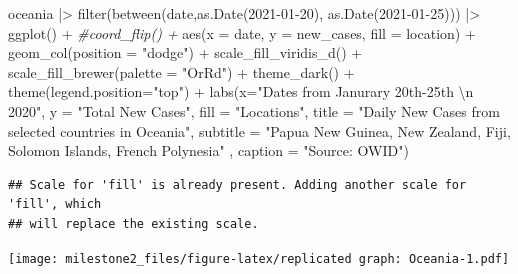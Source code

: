 \documentclass[
]{article}
\newenvironment{Shaded}{\begin{snugshade}}{\end{snugshade}}
\newcommand{\AttributeTok}[1]{\textcolor[rgb]{0.77,0.63,0.00}{#1}}
\newcommand{\CommentTok}[1]{\textcolor[rgb]{0.56,0.35,0.01}{\textit{#1}}}
\newcommand{\FunctionTok}[1]{\textcolor[rgb]{0.00,0.00,0.00}{#1}}
\newcommand{\NormalTok}[1]{#1}
\newcommand{\SpecialCharTok}[1]{\textcolor[rgb]{0.00,0.00,0.00}{#1}}
\newcommand{\StringTok}[1]{\textcolor[rgb]{0.31,0.60,0.02}{#1}}
\begin{document}
\begin{Shaded}
\begin{Highlighting}[]
\NormalTok{oceania }\SpecialCharTok{|\textgreater{}}
  \FunctionTok{filter}\NormalTok{(}\FunctionTok{between}\NormalTok{(date,}\FunctionTok{as.Date}\NormalTok{(}\StringTok{\textquotesingle{}2021{-}01{-}20\textquotesingle{}}\NormalTok{), }\FunctionTok{as.Date}\NormalTok{(}\StringTok{\textquotesingle{}2021{-}01{-}25\textquotesingle{}}\NormalTok{))) }\SpecialCharTok{|\textgreater{}}
  \FunctionTok{ggplot}\NormalTok{() }\SpecialCharTok{+}
  \CommentTok{\#coord\_flip() +}
  \FunctionTok{aes}\NormalTok{(}\AttributeTok{x =}\NormalTok{ date, }\AttributeTok{y =}\NormalTok{ new\_cases, }\AttributeTok{fill =}\NormalTok{ location) }\SpecialCharTok{+}
  \FunctionTok{geom\_col}\NormalTok{(}\AttributeTok{position =} \StringTok{"dodge"}\NormalTok{) }\SpecialCharTok{+}
  \FunctionTok{scale\_fill\_viridis\_d}\NormalTok{() }\SpecialCharTok{+}
  \FunctionTok{scale\_fill\_brewer}\NormalTok{(}\AttributeTok{palette =} \StringTok{"OrRd"}\NormalTok{) }\SpecialCharTok{+}
  \FunctionTok{theme\_dark}\NormalTok{() }\SpecialCharTok{+}
  \FunctionTok{theme}\NormalTok{(}\AttributeTok{legend.position=}\StringTok{"top"}\NormalTok{) }\SpecialCharTok{+}
   \FunctionTok{labs}\NormalTok{(}\AttributeTok{x=}\StringTok{"Dates from Janurary 20th{-}25th }\SpecialCharTok{\textbackslash{}n}\StringTok{ 2020"}\NormalTok{,}
       \AttributeTok{y =} \StringTok{"Total New Cases"}\NormalTok{,}
       \AttributeTok{fill =} \StringTok{"Locations"}\NormalTok{,}
       \AttributeTok{title =} \StringTok{"Daily New Cases from selected countries in Oceania"}\NormalTok{,}
       \AttributeTok{subtitle =} \StringTok{"Papua New Guinea, New Zealand, Fiji, Solomon Islands, French Polynesia"}\NormalTok{ ,}
       \AttributeTok{caption =} \StringTok{"Source: OWID"}\NormalTok{)}
\end{Highlighting}
\end{Shaded}

\begin{verbatim}
## Scale for 'fill' is already present. Adding another scale for 'fill', which
## will replace the existing scale.
\end{verbatim}

\texttt{[image: milestone2\_files/figure-latex/replicated graph: Oceania-1.pdf]}
\end{document}
